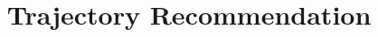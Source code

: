 \documentclass{sig-alternate-05-2015}
\begin{document}

\title{Trajectory Recommendation}


\maketitle


%




%
%


%





\end{document}
